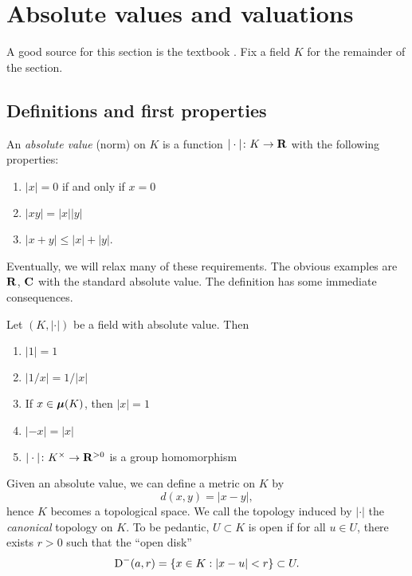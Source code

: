 




\section{Absolute values and valuations}

A good source for this section is the textbook \cite{engler-prestel}. 
Fix a field $K$ for the remainder of the section. 


\subsection{Definitions and first properties}

\begin{definition}
An \emph{absolute value} (norm) on $K$ is a function $|\cdot|\colon K\to \mathbf{R}$ 
with the following properties: 
\begin{enumerate}
\item
$|x|=0$ if and only if $x=0$

\item
$|xy|=|x| |y|$

\item $|x+y|\leqslant |x|+|y|$. 
\end{enumerate}
\end{definition}

Eventually, we will relax many of these requirements. The obvious examples 
are $\mathbf{R}$, $\mathbf{C}$ with the standard absolute value. The definition has some 
immediate consequences. 

\begin{lemma}
Let $(K,|\cdot|)$ be a field with absolute value. Then 
\begin{enumerate}
\item $|1|=1$
\item $|1/x|=1/|x|$
\item If $x\in {\bm\mu}(K)$, then $|x|=1$
\item $|-x|=|x|$
\item $|\cdot|\colon K^\times\to \mathbf{R}^{>0}$ is a group homomorphism
\end{enumerate}
\end{lemma}

Given an absolute value, we can define a metric on $K$ by 
\[
  d(x,y) = |x-y| ,
\]
hence $K$ becomes a topological space. We call the topology induced by 
$|\cdot|$ the \emph{canonical} topology on $K$. To be pedantic, $U\subset K$ 
is open if for all $u\in U$, there exists $r>0$ such that the ``open disk''
\[
  \operatorname{D}^-(a,r) = \{x\in K:|x-u|<r\}\subset U .
\]

